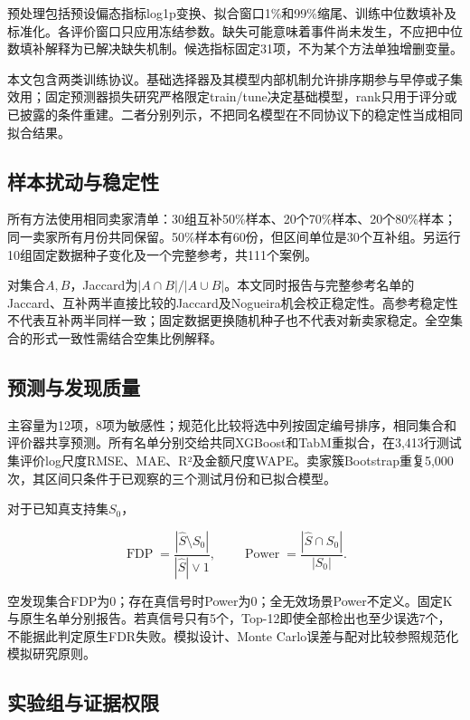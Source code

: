 \documentclass[UTF8,11pt,a4paper]{ctexart}
\begin{document}
预处理包括预设偏态指标log1p变换、拟合窗口1\%和99\%缩尾、训练中位数填补及标准化。各评价窗口只应用冻结参数。缺失可能意味着事件尚未发生，不应把中位数填补解释为已解决缺失机制。候选指标固定31项，不为某个方法单独增删变量。

本文包含两类训练协议。基础选择器及其模型内部机制允许排序期参与早停或子集效用；固定预测器损失研究严格限定train/tune决定基础模型，rank只用于评分或已披露的条件重建。二者分别列示，不把同名模型在不同协议下的稳定性当成相同拟合结果。

\subsection{样本扰动与稳定性}

所有方法使用相同卖家清单：30组互补50\%样本、20个70\%样本、20个80\%样本；同一卖家所有月份共同保留。50\%样本有60份，但区间单位是30个互补组。另运行10组固定数据种子变化及一个完整参考，共111个案例。

对集合\(A,B\)，Jaccard为\(|A\cap B|/|A\cup B|\)。本文同时报告与完整参考名单的Jaccard、互补两半直接比较的Jaccard及Nogueira机会校正稳定性\cite{nogueira2018}。高参考稳定性不代表互补两半同样一致；固定数据更换随机种子也不代表对新卖家稳定。全空集合的形式一致性需结合空集比例解释。

\subsection{预测与发现质量}

主容量为12项，8项为敏感性；规范化比较将选中列按固定编号排序，相同集合和评价器共享预测。所有名单分别交给共同XGBoost和TabM重拟合，在3,413行测试集评价log尺度RMSE、MAE、R²及金额尺度WAPE。卖家簇Bootstrap重复5,000次，其区间只条件于已观察的三个测试月份和已拟合模型。

对于已知真支持集\(S_0\)，

\[
\operatorname{FDP}=\frac{|\widehat S\setminus S_0|}{|\widehat S|\vee1},
\qquad
\operatorname{Power}=\frac{|\widehat S\cap S_0|}{|S_0|}.
\]

空发现集合FDP为0；存在真信号时Power为0；全无效场景Power不定义。固定K与原生名单分别报告。若真信号只有5个，Top-12即使全部检出也至少误选7个，不能据此判定原生FDR失败。模拟设计、Monte Carlo误差与配对比较参照规范化模拟研究原则\cite{morris2019}。

\subsection{实验组与证据权限}
\end{document}
